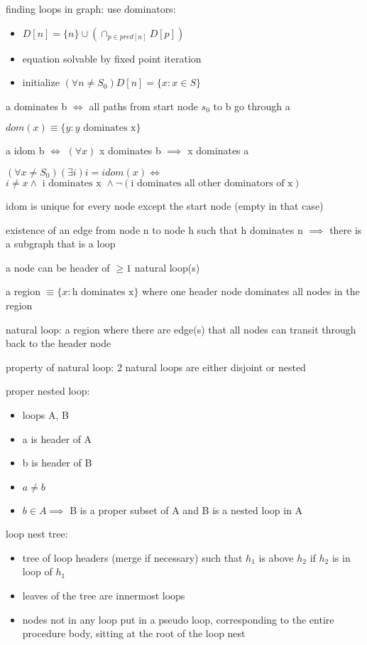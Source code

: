 \documentclass[8pt]{extarticle}
\begin{document}
\begin{multicols*}{2}
  finding loops in graph: use dominators:
  \begin{itemize}
  \item $D[n] = \{ n \} \cup (\cap_{p \in pred[n]} D[p])$
  \item equation solvable by fixed point iteration
  \item initialize $(\forall n \neq S_0) D[n] = \{x: x \in S\}$
  \end{itemize}

  a dominates b $\iff$ all paths from start node $s_0$ to b go through a

  $dom(x) \equiv \{y: y\text{ dominates x}\}$

  a idom b $\iff$ $(\forall x)$ x dominates b $\implies$ x dominates a

  $(\forall x \neq S_0) (\exists i) i = idom(x) \iff$\\
  $i \neq x \wedge \text{ i dominates x } \wedge \neg (\text{i dominates all other dominators of x})$

  idom is unique for every node except the start node (empty in that case)
  
  existence of an edge from node n to node h such that h dominates n $\implies$ there is a subgraph that is a loop

  a node can be header of  $\geq 1$ natural loop(s)

  a region $\equiv \{ x: \text{h dominates x}\}$ where one header node dominates all nodes in the region
  
  natural loop: a region where there are edge(s) that all nodes can transit through back to the header node

  property of natural loop: 2 natural loops are either disjoint or nested
  
  proper nested loop:
  \begin{itemize}
  \item loops A, B
  \item a is header of A
  \item b is header of B
  \item $a \neq b$
  \item $b \in A \implies$ B is a proper subset of A and B is a nested loop in A
  \end{itemize}
  
  loop nest tree:
  \begin{itemize}
  \item tree of loop headers (merge if necessary) such that $h_1$ is above $h_2$ if $h_2$ is in loop of $h_1$
  \item leaves of the tree are innermost loops
  \item nodes not in any loop put in a pseudo loop, corresponding to the entire procedure body, sitting at the root of the loop nest
  \end{itemize}


\end{multicols*}
\end{document}
